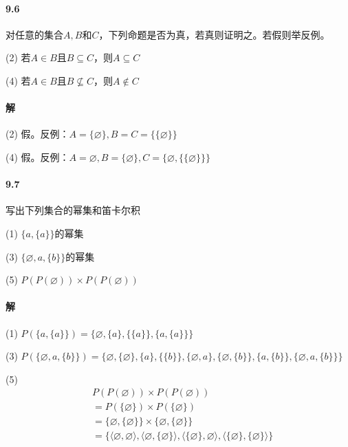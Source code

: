 \documentclass[UTF8]{ctexart}
\begin{document}
\paragraph{9.6}\label{9.6}
对任意的集合$A,B$和$C$，下列命题是否为真，若真则证明之。若假则举反例。

(2) 若$A \in B$且$B \subseteq C$，则$A \subseteq C$

(4) 若$A \in B$且$B \nsubseteq C$，则$A \notin C$

\paragraph{解}
(2) 假。反例：$A = \{ \varnothing \} , B = C = \{ \{ \varnothing \} \} $

(4) 假。反例：$A = \varnothing, B = \{ \varnothing \} , C= \{ \varnothing, \{ \{ \varnothing \} \} \} $

\paragraph{9.7}\label{9.7}
写出下列集合的幂集和笛卡尔积

(1) $\{ a, \{ a \} \} $的幂集

(3) $ \{ \varnothing, a, \{ b \} \} $的幂集

(5) $ P(P(\varnothing)) \times P(P(\varnothing)) $

\paragraph{解}
(1) $P( \{ a, \{ a \} \} ) = \{ \varnothing, \{ a \} , \{ \{ a \} \} , \{ a, \{ a \} \} \} $

(3) $P( \{ \varnothing, a, \{ b \} \} ) = \{ \varnothing, \{ \varnothing \} , \{ a \} , \{ \{ b \} \} , \{ \varnothing, a \} , \{ \varnothing, \{ b \} \} , \{ a, \{ b \} \} , \{ \varnothing, a, \{ b \} \} \} $

(5) 
\begin{align*}
    & P(P(\varnothing)) \times P(P(\varnothing)) \\
    & = P( \{ \varnothing \} ) \times P( \{ \varnothing \} ) \\
    & = \{ \varnothing, \{ \varnothing \} \} \times \{ \varnothing, \{ \varnothing \} \} \\
    & =  \{ \langle \varnothing, \varnothing \rangle , \langle \varnothing, \{ \varnothing \} \rangle , \langle \{ \varnothing \} , \varnothing \rangle , \langle \{ \varnothing \} , \{ \varnothing \} \rangle \} 
\end{align*}
\end{document}
